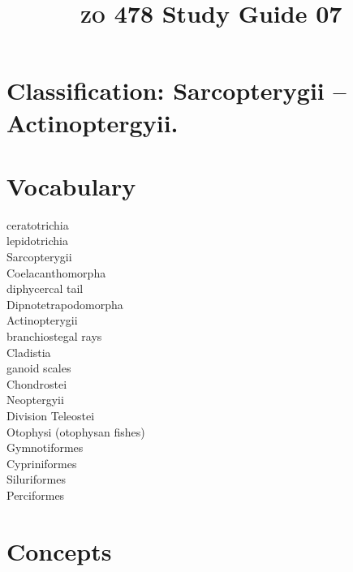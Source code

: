 \documentclass[letterpaper]{tufte-handout}
\title{{\scshape zo} 478 Study Guide 07}
\date{} %
\begin{document}
\maketitle	%

\section*{Classification: Sarcopterygii – Actinoptergyii.}



\section{Vocabulary}
\vspace{-1\baselineskip}
\begin{multicols}{2}
ceratotrichia \\
lepidotrichia \\
Sarcopterygii \\
Coelacanthomorpha \\
diphycercal tail \\
Dipnotetrapodomorpha \\
Actinopterygii \\
branchiostegal rays \\
Cladistia \\
ganoid scales \\
Chondrostei \\
Neoptergyii \\
Division Teleostei \\
Otophysi (otophysan fishes) \\
Gymnotiformes \\
Cypriniformes \\
Siluriformes \\
Perciformes
\end{multicols}

\section{Concepts}
\end{document}
